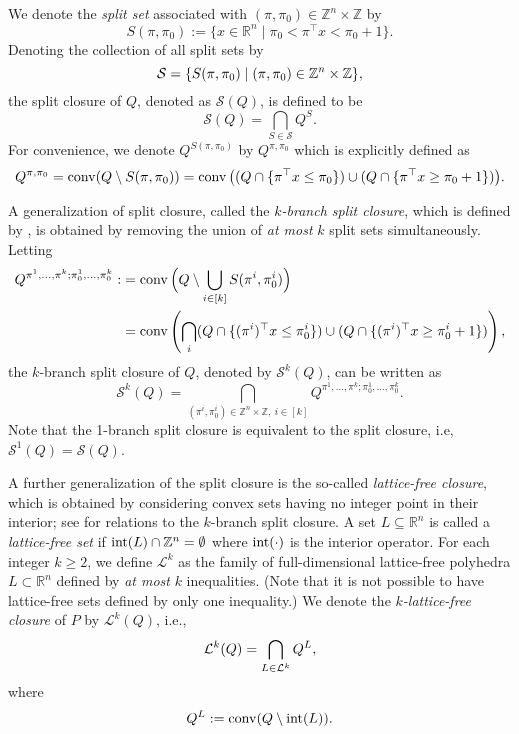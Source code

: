\documentclass[11pt]{article}
\newcommand{\Z}{\mathbb{Z}}
\newcommand{\R}{\mathbb{R}}
\newcommand{\seq}{\subseteq}
\DeclareMathOperator{\conv}{conv}
\renewcommand{\S}{\mathcal{S}}
\newcommand{\Sk}{\S^{k}}
\renewcommand{\L}{\mathcal{L}}
\newcommand{\Mset}{M}
\newcommand{\M}{\mathcal{\Mset}}
\newcommand{\cred}{\color{black}}
\def\conv{\mathop{\rm conv}}
\def\int{\mathop{\rm int}}
\begin{document}
We denote the \emph{split set} associated with $(\pi,\pi_0) \in \Z^n \times \Z$ by
$$S(\pi,\pi_0) := \{ x \in \R^n \mid \pi_0 < \pi^\top x < \pi_0+1\}.$$
{\cred Denoting} the collection of all split sets by 
$$
{\cred \S = \{S(\pi,\pi_0) \mid (\pi,\pi_0) \in \Z^n \times \Z\},}
$$
the split closure of $Q$, denoted as $\S(Q)$, is defined to be 
$$\S(Q) = \bigcap_{S \in \S} Q^S.$$
For convenience, we denote $Q^{S(\pi,\pi_0)}$ by $Q^{\pi,\pi_0} $ which is explicitly defined as 
$$Q^{\pi,\pi_0} = \conv(Q \setminus S(\pi,\pi_0)) = \conv \big( (Q \cap \{ \pi^\top x \leq \pi_0 \}) \cup (Q \cap \{ \pi^\top x \geq \pi_0+1 \}) \big).$$


A generalization of split closure, called the \emph{$k$-branch split closure}, which is defined by \cite{li:ri:2008}, is obtained by removing the union of \emph{at most} $k$ split sets simultaneously. Letting
\begin{align*}
Q^{\pi^1,\dots, \pi^k;\pi^1_0, \dots, \pi^k_0} :&= \conv \Big( Q \setminus \bigcup_{i \in [k]} S(\pi^i,\pi^i_0) \Big) \\
&= \conv \left( \bigcap_i (Q \cap \{ (\pi^i)^\top x \leq \pi^i_0 \}) \cup (Q \cap \{ (\pi^i)^\top x \geq \pi^i_0+1 \}) \right),
\end{align*}
the $k$-branch split closure of $Q$, denoted by $\Sk(Q)$, can be written as
$$\Sk(Q) = \bigcap_{(\pi^i,\pi^i_0) \in \Z^n \times \Z,~i \in [k]} Q^{\pi^1,\dots, \pi^k;\pi^1_0, \dots, \pi^k_0}.$$
Note that the 1-branch split closure is equivalent to the split closure, i.e, $\S^{1}(Q)=\S(Q)$.
 
A further generalization of the split closure is the so-called \emph{lattice-free closure}, which is obtained by considering convex sets having no integer point in their interior; see \cite{dash2012two,dash2014lattice} for relations to the $k$-branch split closure. A set $L \seq \R^n$ is called a \emph{lattice-free set} if $\int(L) \cap \Z^n = \emptyset$ where $\int(\cdot)$ is the interior operator. For each  integer $k \geq 2$, we define $\L^k$ as the family of full-dimensional lattice-free polyhedra $L \subset \R^n$ defined by \emph{at most} $k$ inequalities. (Note that it is not possible to have lattice-free sets defined by only one inequality.) We denote the \emph{$k$-lattice-free closure} of $P$ by $\L^k(Q)$, i.e.,
$$\L^k(Q) = \bigcap_{L \in {\cred \L^k}} Q^L,$$
where 
$$Q^L := \conv (Q \setminus \int(L)).$$
\end{document}
